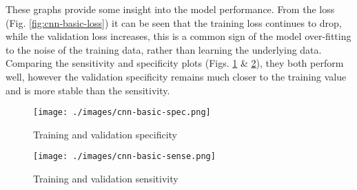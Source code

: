 \documentclass[12pt,a4paper,titlepage,twoside]{report}
\begin{document}
	These graphs provide some insight into the model performance. From the loss (Fig. \ref{fig:cnn-basic-loss}) it can be seen that the training loss continues to drop, while the validation loss increases, this is a common sign of the model over-fitting to the noise of the training data, rather than learning the underlying data. Comparing the sensitivity and specificity plots (Figs. \ref{fig:cnn-basic-spec} \& \ref{fig:cnn-basic-sense}), they both perform well, however the validation specificity remains much closer to the training value and is more stable than the sensitivity. 
	
	\begin{minipage}[b]{\linewidth}
	\begin{minipage}{0.45\textwidth}
		\begin{figure}[H]
			\centering
			\texttt{[image: ./images/cnn-basic-spec.png]}
			\caption{Training and validation specificity}
			\label{fig:cnn-basic-spec}
		\end{figure}
	\end{minipage}%
	\hspace{1cm}%
	\begin{minipage}{0.45\textwidth}
		\centering
		\begin{figure}[H]
			\centering
			\texttt{[image: ./images/cnn-basic-sense.png]}
			\caption{Training and validation sensitivity}
			\label{fig:cnn-basic-sense}
		\end{figure}
	\end{minipage}%
	\end{minipage}
	
	
\end{document}
